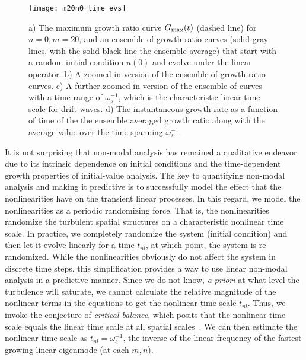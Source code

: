 \documentclass[showpacs,preprintnumbers,amsmath,amssymb,superscriptaddress,aip]{revtex4-1}
\begin{document}
\begin{figure}
\centerline{\texttt{[image: m20n0\_time\_evs]}}
\caption{a) The maximum growth ratio curve $G_{\rm{max}}(t)$ (dashed line) for $n=0,m=20$, and an ensemble of growth ratio curves (solid gray lines, with the solid black line the ensemble average)
that start with a random initial condition $u(0)$ and evolve under the linear operator. b) A zoomed in version of the ensemble of growth ratio curves. c) A further zoomed in version of the ensemble of
curves with a time range of $\omega_s^{-1}$, which is the characteristic linear time scale for drift waves. 
d) The instantaneous growth rate as a function of time of the the ensemble averaged growth ratio along with the average value over the time spanning $\omega_s^{-1}$.}
\label{m20n0_time_evs}
\end{figure}

It is not surprising that non-modal analysis has remained a qualitative endeavor due to its intrinsic dependence on initial conditions and the time-dependent growth properties of initial-value analysis.
The key to quantifying non-modal analysis and making it predictive is to successfully model the effect that the nonlinearities have on the transient linear processes.
In this regard, we model the nonlinearities as a periodic randomizing force. That is, the nonlinearities randomize the turbulent spatial structures on a characteristic nonlinear time scale. 
In practice, we completely randomize the system (initial condition) and then let it evolve linearly for a time $t_{nl}$, at which point, the system is re-randomized.
While the nonlinearities obviously do not affect the system in discrete time steps, this simplification provides a way to use linear non-modal analysis in a predictive manner. 
Since we do not know, \emph{a priori} at what level the turbulence will saturate, 
we cannot calculate the relative magnitude of the nonlinear terms in the equations to get the nonlinear time scale $t_{nl}$.
Thus, we invoke the conjecture of \emph{critical balance}, which posits that the nonlinear time scale equals the linear time scale at all spatial scales~\cite{schekochihin2012}. 
We can then estimate the nonlinear time scale as $t_{nl} = \omega_s^{-1}$, the inverse of the linear frequency of the fastest growing linear eigenmode (at each $m,n$).
\end{document}
